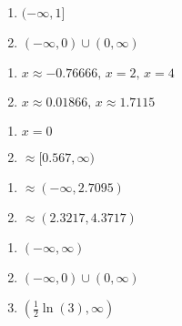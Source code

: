 \begin{multicols}{2} 
\begin{enumerate}
\setcounter{enumi}{\value{HW}}

\item $(-\infty, 1]$
\item $(-\infty, 0) \cup (0, \infty)$


\setcounter{HW}{\value{enumi}}
\end{enumerate}
\end{multicols}

\begin{multicols}{2} 
\begin{enumerate}
\setcounter{enumi}{\value{HW}}

\item $x \approx -0.76666, \, x = 2, \, x = 4$
\item $x \approx 0.01866, \, x \approx 1.7115$


\setcounter{HW}{\value{enumi}}
\end{enumerate}
\end{multicols}

\begin{multicols}{2} 
\begin{enumerate}
\setcounter{enumi}{\value{HW}}

\item $x = 0$
\item $\approx [0.567, \infty)$

\setcounter{HW}{\value{enumi}}
\end{enumerate}
\end{multicols}

\begin{multicols}{2} 
\begin{enumerate}
\setcounter{enumi}{\value{HW}}

\item $\approx (-\infty, 2.7095)$
\item $\approx (2.3217, 4.3717)$


\setcounter{HW}{\value{enumi}}
\end{enumerate}
\end{multicols}


\begin{multicols}{3} 
\begin{enumerate}
\setcounter{enumi}{\value{HW}}

\item  $(-\infty, \infty)$   
\item   $(-\infty, 0) \cup (0, \infty)$  
\item     $\left( \frac{1}{2} \ln(3), \infty \right)$

\setcounter{HW}{\value{enumi}}
\end{enumerate}
\end{multicols}


